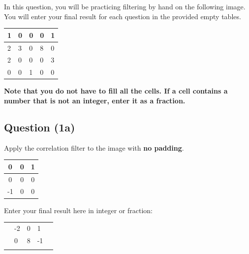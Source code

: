 \documentclass[12pt]{article}
\begin{document}

\noindent In this question, you will be practicing filtering by hand on the following image. You will enter your final result for each question in the provided empty tables.

\begin{center}
\begin{tabular}{|l|l|l|l|l|}
\hline
1 & 0 & 0 & 0 & 1 \\ \hline
2 & 3 & 0 & 8 & 0 \\ \hline
2 & 0 & 0 & 0 & 3 \\ \hline
0 & 0 & 1 & 0 & 0 \\ \hline
\end{tabular}
\end{center}
\textbf{Note that you do not have to fill all the cells. If a cell contains a number that is not an integer, enter it as a fraction.}

\subsection*{Question (1a)} Apply the correlation filter to the image with \textbf{no padding}.
\begin{center}
\begin{tabular}{|c|c|c|}
\hline
0  & 0 & 1 \\ \hline
0  & 0 & 0 \\ \hline
-1 & 0 & 0 \\ \hline
\end{tabular}
\end{center}

\noindent Enter your final result here in integer or fraction:

\begin{center}
\begin{tabular}{|l|l|l|l|l|}
\hline
\hspace{1mm} & \hspace{1mm} & \hspace{1mm} & \hspace{1mm} & \hspace{1mm} \\ \hline
\hspace{1mm} & -2 & 0 & 1 & \hspace{1mm} \\ \hline
\hspace{1mm} & 0 & 8 & -1 & \hspace{1mm} \\ \hline
\hspace{1mm} & \hspace{1mm} & \hspace{1mm} & \hspace{1mm} & \hspace{1mm} \\ \hline
\end{tabular}
\end{center}
\end{document}
